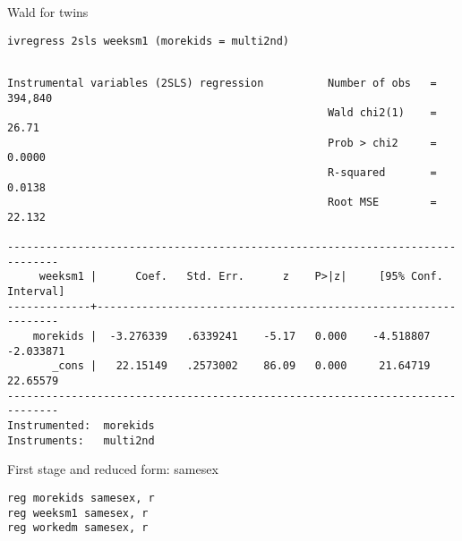 \documentclass[11pt]{article}
\begin{document}
Wald for twins
\begin{verbatim}
ivregress 2sls weeksm1 (morekids = multi2nd)
\end{verbatim}

\begin{verbatim}

Instrumental variables (2SLS) regression          Number of obs   =    394,840
                                                  Wald chi2(1)    =      26.71
                                                  Prob > chi2     =     0.0000
                                                  R-squared       =     0.0138
                                                  Root MSE        =     22.132

------------------------------------------------------------------------------
     weeksm1 |      Coef.   Std. Err.      z    P>|z|     [95% Conf. Interval]
-------------+----------------------------------------------------------------
    morekids |  -3.276339   .6339241    -5.17   0.000    -4.518807   -2.033871
       _cons |   22.15149   .2573002    86.09   0.000     21.64719    22.65579
------------------------------------------------------------------------------
Instrumented:  morekids
Instruments:   multi2nd
\end{verbatim}

First stage and reduced form: samesex
\begin{verbatim}
reg morekids samesex, r
reg weeksm1 samesex, r
reg workedm samesex, r
\end{verbatim}
\end{document}

